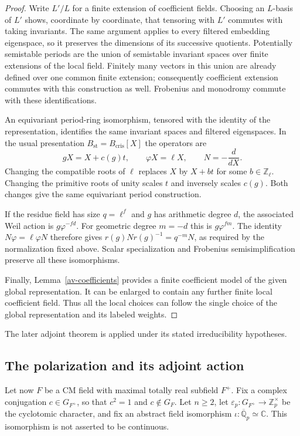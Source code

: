 \begin{proof}
Write $L'/L$ for a finite extension of coefficient fields.
Choosing an $L$-basis of $L'$ shows, coordinate by coordinate,
that tensoring with $L'$ commutes with taking invariants.
The same argument applies to every filtered embedding
eigenspace, so it preserves the dimensions of its successive
quotients. Potentially semistable periods are the union of
semistable invariant spaces over finite extensions of the local
field. Finitely many vectors in this union are already defined
over one common finite extension; consequently coefficient
extension commutes with this construction as well. Frobenius
and monodromy commute with these identifications.

An equivariant period-ring isomorphism, tensored with the
identity of the representation, identifies the same invariant
spaces and filtered eigenspaces. In the usual presentation
$B_{\mathrm{st}}=B_{\mathrm{cris}}[X]$ the operators are
\[
 gX=X+c(g)t,\qquad \varphi X=\ell X,
 \qquad N=-\frac{d}{dX}.
\]
Changing the compatible roots of $\ell$ replaces $X$ by
$X+bt$ for some $b\in\mathbb Z_\ell$. Changing the primitive
roots of unity scales $t$ and inversely scales $c(g)$.
Both changes give the same equivariant period construction.

If the residue field has size $q=\ell^f$ and $g$ has
arithmetic degree $d$, the associated Weil action is
$g\varphi^{-fd}$. For geometric degree $m=-d$ this is
$g\varphi^{fm}$. The identity $N\varphi=\ell\varphi N$
therefore gives
$r(g)Nr(g)^{-1}=q^{-m}N$, as required by the normalization
fixed above. Scalar specialization and Frobenius
semisimplification preserve all these isomorphisms.

Finally, Lemma~\ref{av-coefficients} provides a finite
coefficient model of the given global representation. It can
be enlarged to contain any further finite local coefficient
field. Thus all the local choices can follow the single
choice of the global representation and its labeled weights.
\end{proof}

The later adjoint theorem is applied under its stated irreducibility
hypotheses.

\subsection{The polarization and its adjoint action}

Let now $F$ be a CM field with maximal totally real subfield
$F^+$. Fix a complex conjugation $c\in G_{F^+}$, so that
$c^2=1$ and $c\notin G_F$. Let $n\ge2$, let
$\varepsilon_p:G_{F^+}\longrightarrow\mathbb Z_p^\times$
be the cyclotomic character, and fix an abstract field
isomorphism $\iota:\overline{\mathbb Q}_p\simeq\mathbb C$.
This isomorphism is not asserted to be continuous.

